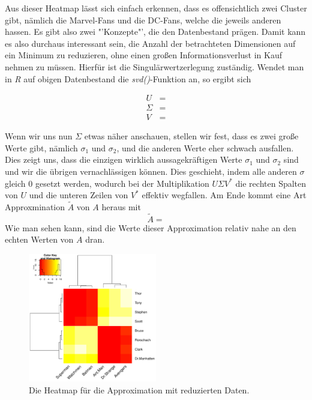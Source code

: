 Aus dieser Heatmap lässt sich einfach erkennen, dass es offensichtlich zwei
Cluster gibt, nämlich die Marvel-Fans und die DC-Fans, welche die jeweils anderen
hassen. Es gibt also zwei "'Konzepte"', die den Datenbestand prägen. Damit kann
es also durchaus interessant sein, die Anzahl der betrachteten Dimensionen auf ein
Minimum zu reduzieren, ohne einen großen Informationsverlust in Kauf nehmen zu müssen.
Hierfür ist die Singulärwertzerlegung zuständig. Wendet man in \textit{R} auf
obigen Datenbestand die \textit{svd()}-Funktion an, so ergibt sich

\begin{align*}
	U &= \\
	\Sigma &= \\
	V &= 
\end{align*}

Wenn wir uns nun \(\Sigma\) etwas näher anschauen, stellen wir fest, dass es
zwei große Werte gibt, nämlich \(\sigma_1\) und \(\sigma_2\), und die anderen
Werte eher schwach ausfallen. Dies zeigt uns, dass die einzigen wirklich aussagekräftigen
Werte \(\sigma_1\) und \(\sigma_2\) sind und wir die übrigen vernachlässigen
können. Dies geschieht, indem alle anderen \(\sigma\) gleich \(0\) gesetzt werden,
wodurch bei der Multiplikation \(U\Sigma V^*\) die rechten Spalten von \(U\) und die
unteren Zeilen von \(V^*\) effektiv wegfallen.
Am Ende kommt eine Art Approxmination \(\tilde{A}\) von \(A\) heraus mit
\[
	\tilde{A} = 
\]
Wie man sehen kann, sind die Werte dieser Approximation relativ nahe an den
echten Werten von \(A\) dran.

\begin{figure}[!th]
	\center
	\includegraphics[width=0.5\textwidth]{Figures/reduced_data}
	\caption{Die Heatmap für die Approximation mit reduzierten Daten.}
	\label{fig:reduced_data}
\end{figure}

